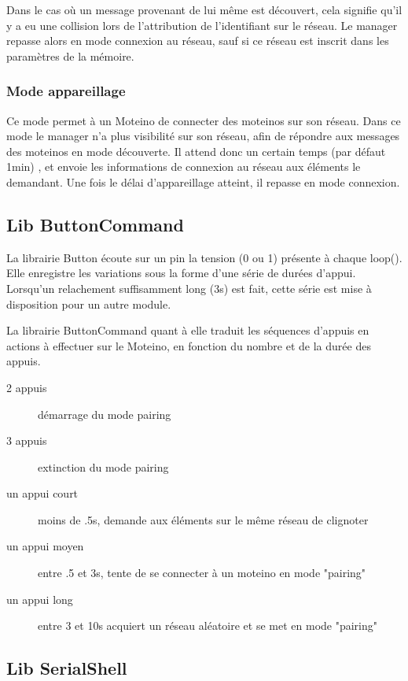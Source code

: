 \documentclass[a4paper]{report}
\begin{document}
Dans le cas où un message provenant de lui même est découvert, cela signifie qu'il y a eu une collision lors de l'attribution de l'identifiant sur le réseau. Le manager repasse alors en mode connexion au réseau, sauf si ce réseau est inscrit dans les paramètres de la mémoire.

\subsubsection{Mode appareillage}

Ce mode permet à un Moteino de connecter des moteinos sur son réseau. Dans ce mode le manager n'a plus visibilité sur son réseau, afin de répondre aux messages des moteinos en mode découverte. Il attend donc un certain temps (par défaut 1min) , et envoie les informations de connexion au réseau aux éléments le demandant. Une fois le délai d'appareillage atteint, il repasse en mode connexion.

\subsection{Lib ButtonCommand}

La librairie Button écoute sur un pin la tension (0 ou 1) présente à chaque loop(). Elle enregistre les variations sous la forme d'une série de durées d'appui. Lorsqu'un relachement suffisamment long (3s) est fait, cette série est mise à disposition pour un autre module.

La librairie ButtonCommand quant à elle traduit les séquences d'appuis en actions à effectuer sur le Moteino, en fonction du nombre et de la durée des appuis.
\begin{description}
\item[2 appuis] démarrage du mode pairing
\item[3 appuis] extinction du mode pairing
\item[un appui court] moins de .5s, demande aux éléments sur le même réseau de clignoter
\item[un appui moyen] entre .5 et 3s, tente de se connecter à un moteino en mode "pairing"
\item[un appui long] entre 3 et 10s acquiert un réseau aléatoire et se met en mode "pairing"
\end{description}

\subsection{Lib SerialShell}
\end{document}
